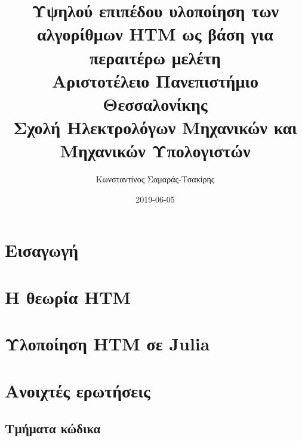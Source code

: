 \documentclass[a4paper,11pt,twoside]{report}
\title{
{Υψηλού επιπέδου υλοποίηση των αλγορίθμων HTM ως βάση για περαιτέρω μελέτη}\\
{\large Αριστοτέλειο Πανεπιστήμιο Θεσσαλονίκης}\\
{\large Σχολή Ηλεκτρολόγων Μηχανικών και Μηχανικών Υπολογιστών}
}
\author{Κωνσταντίνος Σαμαράς-Τσακίρης}
\date{2019-06-05}
\begin{document}
\maketitle
%

\tableofcontents{}

\chapter{Εισαγωγή}


\chapter{Η θεωρία HTM}


\chapter{Υλοποίηση HTM σε Julia}



\chapter{Ανοιχτές ερωτήσεις}
%

\printbibliography

\begin{appendices}
\chapter{Τμήματα κώδικα}

\end{appendices}
\end{document}
